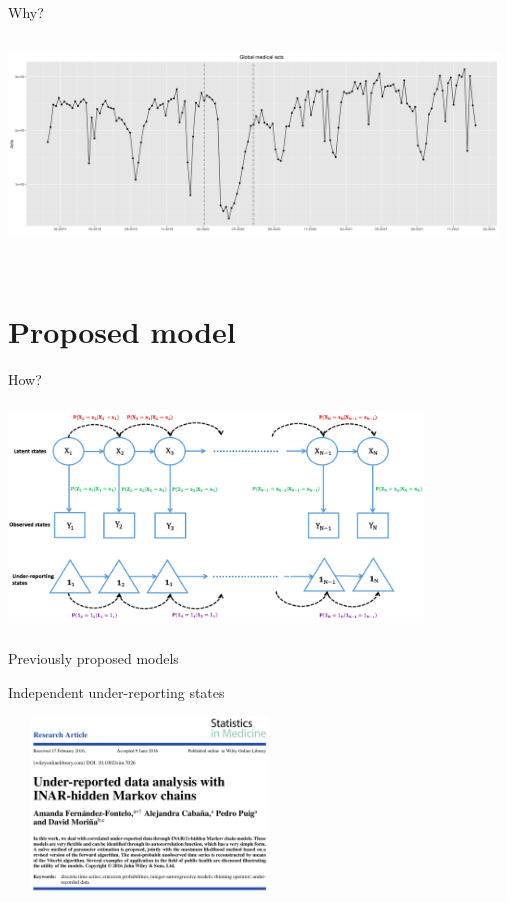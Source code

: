 \documentclass[aspectratio=169,usepdftitle=true]{beamer}
\begin{document}
\begin{frame}{Why?}
\hspace{-0.9in}
  \includegraphics[height=6.5cm,width=13cm]{global_acts.png}
\end{frame}

\section{Proposed model}
\begin{frame}{How?}
\begin{center}
\includegraphics[height=6cm,width=11cm]{HMC.png}
\end{center}
\end{frame}

\begin{frame}[c]{Previously proposed models}
    \begin{block}{Independent under-reporting states}
        \begin{center}
           \includegraphics[height=4.7cm,width=7.5cm]{SiM1.png}
        \end{center}
    \end{block}
\end{frame}
\end{document}
